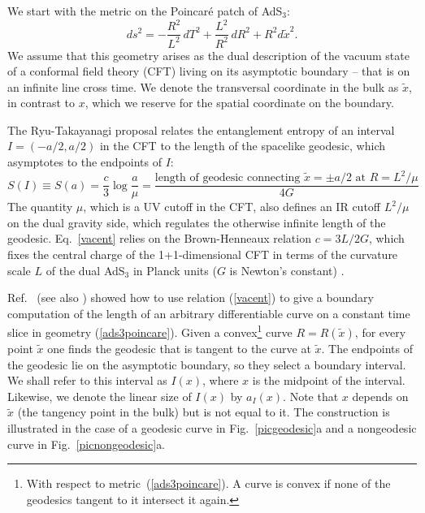 \documentclass[12pt]{article}
\newcommand{\figref}[1]{Fig.~\ref{#1}}
\begin{document}
We start with the metric on the Poincar\'e patch of AdS$_3$:
\begin{equation}
ds^2 = - \frac{R^2}{L^2}\, dT^2 + \frac{L^2}{R^2}\, dR^2 + R^2 d\tilde{x}^2.
\label{ads3poincare}
\end{equation}
We assume that this geometry arises as the dual description of the vacuum state of a conformal field theory (CFT) living on its asymptotic boundary -- that is on an infinite line cross time. We denote the transversal coordinate in the bulk as $\tilde{x}$, in contrast to $x$, which we reserve for the spatial coordinate on the boundary.

The Ryu-Takayanagi proposal \cite{rt1, rt2} relates the entanglement entropy of an interval $I = (-a/2, a/2)$ in the CFT to the length of the spacelike geodesic, which asymptotes to the endpoints of $I$:
\begin{equation}
S(I) \equiv S(a) = \frac{c}{3} \log \frac{a}{\mu} = \frac{\textrm{length of geodesic connecting $\tilde{x}=\pm a/2$ at $R=L^2/\mu$}}{4G}
\label{vacent}
\end{equation}
The quantity $\mu$, which is a UV cutoff in the CFT, also defines an IR cutoff $L^2/\mu$ on the dual gravity side, which regulates the otherwise infinite length of the geodesic. Eq.~\eqref{vacent} relies on the Brown-Henneaux relation $c = 3L/2G$, which fixes the central charge of the 1+1-dimensional CFT in terms of the curvature scale $L$ of the dual AdS$_3$ in Planck units ($G$ is Newton's constant) \cite{brownhen}.

Ref.~\cite{holeography} (see also \cite{roblast, xi, entwinement, Wienthesis, robproof, lampros}) showed how to use relation (\ref{vacent}) to give a boundary computation of the length of an arbitrary differentiable curve on a constant time slice in geometry (\ref{ads3poincare}). Given a convex\footnote{With respect to metric~(\ref{ads3poincare}). A curve is convex if none of the geodesics tangent to it intersect it again.} curve $R = R(\tilde{x})$, for every point $\tilde{x}$ one finds the geodesic that is tangent to the curve at $\tilde{x}$. The endpoints of the geodesic lie on the asymptotic boundary, so they select a boundary interval. We shall refer to this interval as $I(x)$, where $x$ is the midpoint of the interval.
Likewise, we denote the linear size of $I(x)$ by $a_I(x)$.
Note that $x$ depends on $\tilde{x}$ (the tangency point in the bulk) but is not equal to it. The construction is illustrated in the case of a geodesic curve in \figref{picgeodesic}a and a nongeodesic curve in \figref{picnongeodesic}a.
\end{document}
